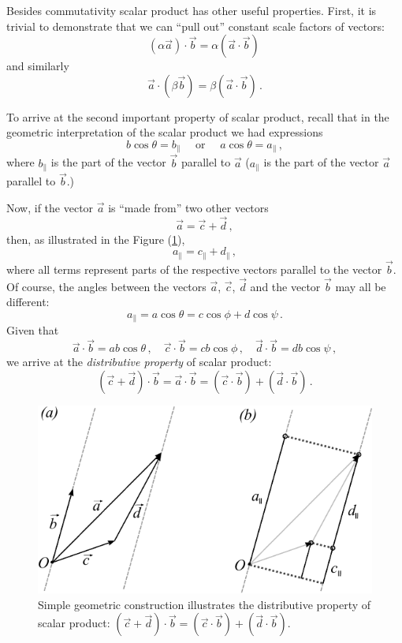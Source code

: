 Besides commutativity scalar product has other useful
properties. First, it is trivial to demonstrate that we can ``pull out''
constant scale factors of vectors:
\[
(\alpha\vec{a})\cdot\vec{b}=\alpha(\vec{a}\cdot\vec{b})\,
\]
and similarly
\[
\vec{a}\cdot(\beta \vec{b})=\beta(\vec{a}\cdot\vec{b})\,.
\]

To arrive at the second important property of scalar product, recall
that in the geometric
interpretation of the scalar product we had expressions
\[
b\cos\theta = b_\parallel\quad\textrm{ or }\quad a\cos\theta = a_\parallel\,,
\]
where $b_\parallel$ is the part of the vector $\vec{b}$ parallel to
$\vec{a}$ ($a_\parallel$ is the part of the vector $\vec{a}$ parallel to
$\vec{b}$.)

Now, if the vector $\vec{a}$ is ``made from'' two other vectors
\[
\vec{a}=\vec{c}+\vec{d}\,,
\]
then, as illustrated in the Figure (\ref{fig:scalarProductProperty}),
\[
a_{\parallel}=c_{\parallel}+d_{\parallel}\,,
\]
where all terms represent parts of the respective vectors parallel to
the vector $\vec{b}$. Of course, the angles between the vectors
$\vec{a}$, $\vec{c}$, $\vec{d}$ and the vector $\vec{b}$ may all be different:
\[
a_{\parallel}=a\cos\theta = c\cos\phi + d\cos\psi\,.
\]
Given that
\[
\vec{a}\cdot\vec{b} = ab\cos\theta\,,\quad
\vec{c}\cdot\vec{b} = cb\cos\phi\,,\quad
\vec{d}\cdot\vec{b} = db\cos\psi\,,
\]
we arrive at the \emph{distributive property}
of scalar product:
\[
(\vec{c}+\vec{d})\cdot\vec{b}=\vec{a}\cdot\vec{b}=(\vec{c}\cdot\vec{b})+(\vec{d}\cdot\vec{b})\,.
\]
\begin{figure}[htbp]
  \centering
  \includegraphics[scale=1.0]{scalarProductProperty}
  \caption{Simple geometric construction illustrates the distributive
    property of scalar product:
    $(\vec{c}+\vec{d})\cdot\vec{b}=(\vec{c}\cdot\vec{b})+(\vec{d}\cdot\vec{b})$.}
  \label{fig:scalarProductProperty}
\end{figure}

